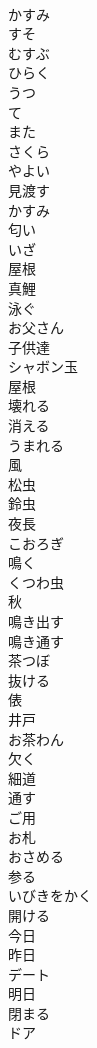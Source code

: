\documentclass[8pt]{extreport}
\begin{document}
\begin{CJK}{UTF8}{min}
\\	かすみ
\\	すそ
\\	むすぶ
\\	ひらく
\\	うつ
\\	て
\\	また
\\	さくら
\\	やよい
\\	見渡す
\\	かすみ
\\	匂い
\\	いざ
\\	屋根
\\	真鯉
\\	泳ぐ
\\	お父さん
\\	子供達
\\	シャボン玉
\\	屋根
\\	壊れる
\\	消える
\\	うまれる
\\	風
\\	松虫
\\	鈴虫
\\	夜長
\\	こおろぎ
\\	鳴く
\\	くつわ虫
\\	秋
\\	鳴き出す
\\	鳴き通す
\\	茶つぼ
\\	抜ける
\\	俵
\\	井戸
\\	お茶わん
\\	欠く
\\	細道
\\	通す
\\	ご用
\\	お札
\\	おさめる
\\	参る
\\	いびきをかく
\\	開ける
\\	今日
\\	昨日
\\	デート
\\	明日
\\	閉まる
\\	ドア

\end{CJK}
\end{document}
